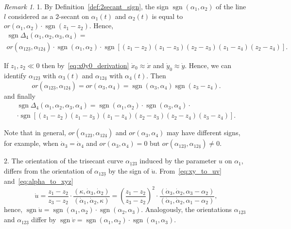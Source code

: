 \documentclass{article}
\theoremstyle{definition}
\theoremstyle{remark}
\newtheorem{remark}{Remark}
\DeclareMathOperator{\sgn}{\mathrm{sgn}}
\begin{document}
\begin{remark}\label{rem:4secant_geom}
1. By Definition~\ref{def:2secant_sign}, the sign $\sgn(\alpha_1,\alpha_2)$ of the line $l$ considered as a $2$-secant on $\alpha_1(t)$ and $\alpha_2(t)$ is equal to $or(\alpha_1,\alpha_2)\cdot\sgn(z_1-z_2)$. Hence,
\begin{multline*}
\sgn\Delta_4(\alpha_1,\alpha_2,\alpha_3,\alpha_4)=\\
or(\alpha_{12\underline{3}},\alpha_{12\underline{4}})\cdot \sgn(\alpha_1,\alpha_2)\cdot\sgn[(z_1-z_2)(z_1-z_3)(z_2-z_3)(z_1-z_4)(z_2-z_4)].
\end{multline*}

If $z_1,z_2\ll 0$ then by~\eqref{eq:x0y0_derivation} $\dot x_0\approx\dot x$ and $\dot y_0\approx\dot y$. Hence, we can identify $\alpha_{12\underline{3}}$ with $\alpha_3(t)$ and  $\alpha_{12\underline{4}}$ with $\alpha_4(t)$. Then
\[
or(\alpha_{12\underline{3}},\alpha_{12\underline{4}})=or(\alpha_3,\alpha_4)=\sgn(\alpha_3,\alpha_4)\sgn(z_3-z_4).
\]
and finally
\begin{multline}\label{far_secant_sheaf}
 \sgn\Delta_4(\alpha_1,\alpha_2,\alpha_3,\alpha_4)=\sgn(\alpha_1,\alpha_2)\cdot\sgn(\alpha_3,\alpha_4)\cdot\\
 \cdot\sgn[(z_1-z_2)(z_1-z_3)(z_1-z_4)(z_2-z_3)(z_2-z_4)(z_3-z_4)].
\end{multline}

Note that in general, $or(\alpha_{12\underline{3}},\alpha_{12\underline{4}})$ and $or(\alpha_3,\alpha_4)$ may have different signs, for example, when $\dot\alpha_3=\dot\alpha_4$ and $or(\alpha_3,\alpha_4)=0$ but $or(\alpha_{12\underline{3}},\alpha_{12\underline{4}})\ne 0$.

2. The orientation of the trisecant curve $\alpha_{\underline{1}23}$ induced by the parameter $u$ on $\alpha_1$, differs from the orientation of $\alpha_{12\underline{3}}$ by the sign of $\dot u$. From~\eqref{eq:xy_to_uv} and~\eqref{eq:alpha_to_xyz}
\[
\dot u=\frac{z_1-z_2}{z_3-z_2}\cdot\frac{(\kappa,\dot\alpha_3,\dot\alpha_2)}{(\dot\alpha_1,\dot\alpha_2,\kappa)}=
\left(\frac{z_1-z_2}{z_3-z_2}\right)^2\cdot\frac{(\dot\alpha_3,\dot\alpha_2,\alpha_3-\alpha_2)}{(\dot\alpha_1,\dot\alpha_2,\alpha_1-\alpha_2)},
\]
hence, $\sgn\dot u=\sgn(\alpha_1,\alpha_2)\cdot\sgn(\alpha_2,\alpha_3)$. Analogously, the orientations $\alpha_{1\underline{2}3}$ and  $\alpha_{12\underline{3}}$ differ by
$\sgn\dot v=\sgn(\alpha_1,\alpha_2)\cdot\sgn(\alpha_1,\alpha_3)$.
\end{remark}
\end{document}

